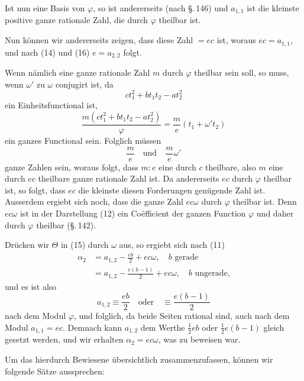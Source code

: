 Ist nun
eine Basis von $\varphi$, so ist andererseits (nach \S.\,146)
und $a_{1,1}$ ist die kleinste positive ganze rationale Zahl, die durch $\varphi$ theilbar ist.

Nun k\"onnen wir andererseits zeigen, dass diese Zahl $= ec$ ist, woraus $ec = a_{1,1}$, und nach (14) und (16) $e = a_{2,2}$ folgt.

Wenn n\"amlich eine ganze rationale Zahl $m$ durch $\varphi$ theilbar sein soll, so muss, wenn $\omega'$ zu $\omega$ conjugirt ist, da
\[
ct_1^2 + bt_1t_2 - at_2^2
\]
ein Einheitsfunctional ist,
\[
\frac{m(ct_1^2+bt_1t_2-at_2^2)}{\varphi} = \frac{m}{e}(t_1+\omega' t_2)
\]
ein ganzes Functional sein. Folglich m\"ussen
\[
\frac{m}{e} \quad \text{und} \quad \frac{m}{e}\omega'
\]
ganze Zahlen sein, woraus folgt, dass $m : e$ eine durch $c$ theilbare, also $m$ eine durch $ec$ theilbare ganze rationale Zahl ist. Da andererseits $ec$ durch $\varphi$ theilbar ist, so folgt, dass $ec$ die kleinste diesen Forderungen gen\"ugende Zahl ist. Ausserdem ergiebt sich noch, dass die ganze Zahl $ec\omega$ durch $\varphi$ theilbar ist. Denn $ec\omega$ ist in der Darstellung (12) ein Co\"efficient der ganzen Function $\varphi$ und daher durch $\varphi$ theilbar (\S.\,142).

Dr\"ucken wir $\Theta$ in (15) durch $\omega$ aus, so ergiebt sich nach (11)
\[
\begin{aligned}
\alpha_2 &= a_{1,2} - \frac{eb}{2} + ec\omega, \quad b \text{ gerade}\\
&= a_{1,2} - \frac{e(b-1)}{2} + ec\omega, \quad b \text{ ungerade,}
\end{aligned}
\]
und es ist also
\[
a_{1,2} \equiv \frac{eb}{2} \quad \text{oder} \quad \equiv \frac{e(b-1)}{2}
\]
nach dem Modul $\varphi$, und folglich, da beide Seiten rational sind, auch nach dem Modul $a_{1,1}=ec$. Demnach kann $a_{1,2}$ dem Werthe $\frac{1}{2}eb$ oder $\frac{1}{2}e(b-1)$ gleich gesetzt werden, und wir erhalten $\alpha_2 = ec\omega$, was zu beweisen war.

Um das hierdurch Bewiesene \"ubersichtlich zusammenzufassen, k\"onnen wir folgende S\"atze aussprechen:
